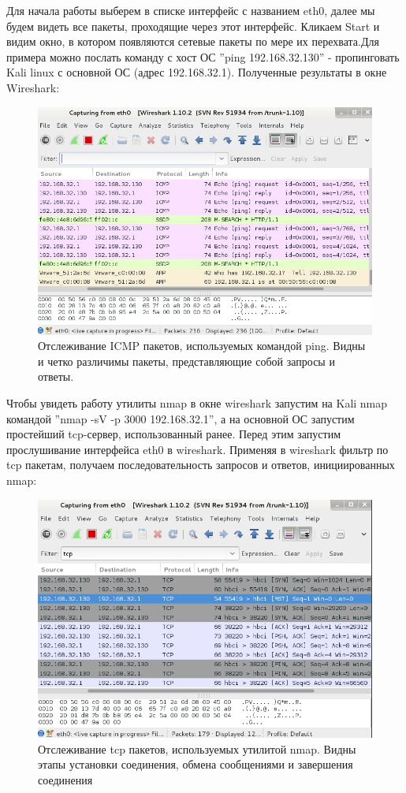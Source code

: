 \documentclass[a4paper, 14pt]{article}				%
\begin{document}
Для начала работы выберем в списке интерфейс с названием eth0, далее мы будем видеть все пакеты, проходящие через этот интерфейс. Кликаем Start и видим окно, в котором появляются сетевые пакеты по мере их перехвата.Для примера можно послать команду с хост ОС ''ping 192.168.32.130'' - пропинговать Kali linux с основной ОС (адрес 192.168.32.1). Полученные результаты в окне Wireshark:
\begin{figure}[h!]
\centering
\includegraphics[width=\textwidth]{rsrc/nmap_wireshark_ping}
\caption{Отслеживание ICMP пакетов, используемых командой ping. Видны и четко различимы пакеты, представляющие собой запросы и ответы.}
\end{figure}

Чтобы увидеть работу утилиты nmap в окне wireshark запустим на Kali nmap командой ''nmap -sV -p 3000 192.168.32.1'', а на основной ОС запустим простейший tcp-сервер, использованный ранее. Перед этим запустим прослушивание интерфейса eth0 в wireshark. Применяя в wireshark фильтр по tcp пакетам, получаем последовательность запросов и ответов, инициированных nmap:
\begin{figure}[h!]
\centering
\includegraphics[width=\textwidth]{rsrc/nmap_wireshark_sv}
\caption{Отслеживание tcp пакетов, используемых утилитой nmap. Видны этапы установки соединения, обмена сообщениями и завершения соединения}
\end{figure}
\end{document}
